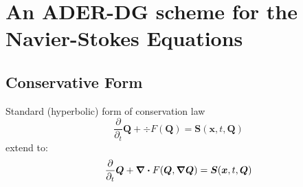 
\newcommand{\Q}{\bm{Q}}
\newcommand{\gradQ}{\gradient{\Q}}
\newcommand{\Qrho}{\rho}
\newcommand{\Qj}{\rho \bm{v}}
\newcommand{\Qv}{\bm{v}}
\newcommand{\QE}{\rho E}
\newcommand{\QZZ}{Z} %
\newcommand{\QZ}{\rho \QZZ}
\newcommand{\potT}{\theta}
\newcommand{\backgroundPotT}{\overline{\theta}}
\newcommand{\pertubationPotT}{\theta'}
\newcommand{\stressT}{\bm{\sigma}}
\newcommand{\pressure}{p}
\newcommand{\maxConvEigen}[1][]{
  \vert%
  \lambda_c^{\text{max}}
  \notblank{#1}{\left(#1\right)}{}
  \vert%
}
\newcommand{\maxViscEigen}[1][]{
  \vert%
  \lambda_v^{\text{max}}
  \notblank{#1}{\left(#1\right)}{}
  \vert%
}
\newcommand{\Riemann}{\operatorname{Riemann}}

\newcommand{\domain}{\Omega}
\newcommand{\broken}{\domain}
\newcommand{\cell}[1][i]{C_{#1}}
\newcommand{\boundary}{\partial \domain}
\newcommand{\sbasis}[1]{\Phi_{#1}}
\newcommand{\stbasis}[1]{\Phi_{#1}}
\newcommand{\testfunction}[1]{\Phi_{#1}}
\newcommand{\normal}{\bm{n}}
\newcommand{\dsol}[1][h]{\bm{u}_{#1}}
\newcommand{\stpredictor}[1][h]{\bm{q}_{#1}}

\newcommand{\flux}{F}
\newcommand{\viscFlux}{\flux^{v}}
\newcommand{\hyperFlux}{\flux^{h}}
\newcommand{\source}{\bm{S}}

\newcommand{\intdt}[1]{\int_{t^n}^{t^{n+1}} #1 \dd{t}}
\newcommand{\intdcell}[1]{\int_{\cell} #1 \dd{\bm{x}}}
\newcommand{\intdcellb}[1]{\int_{\partial{} \cell} #1 \dd{S}} %


\chapter{An ADER-DG scheme for the Navier-Stokes Equations}\label{chap:methods}
\section{Conservative Form}
Standard (hyperbolic) form of conservation law
\begin{equation}
  \label{eq:conservation-law}
 \frac{\partial}{\partial_t}  \Q + \div \flux(\Q) = \source(\bm{x}, t, \Q)
\end{equation}
extend to:
\begin{equation}
  \label{eq:conservation-law-gradient}
 \frac{\partial}{\partial_t}  \Q + \div \flux(\Q, \gradQ) = \source(\bm{x}, t, \Q)
\end{equation}

